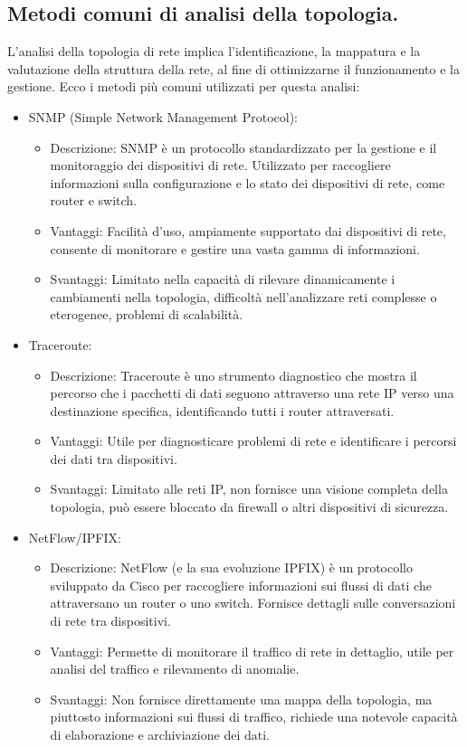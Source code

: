 \documentclass[target=bach,aauheader=,style=]{thud}
\begin{document}
\subsection{Metodi comuni di analisi della topologia.}
L'analisi della topologia di rete implica l'identificazione, la mappatura e la valutazione della struttura della rete, al fine di ottimizzarne il funzionamento e la gestione. Ecco i metodi più comuni utilizzati per questa analisi:
\begin{itemize}
  \item SNMP (Simple Network Management Protocol):
    \begin{itemize}
      \item Descrizione: SNMP è un protocollo standardizzato per la gestione e il monitoraggio dei dispositivi di rete. Utilizzato per raccogliere informazioni sulla configurazione e lo stato dei dispositivi di rete, come router e switch.
      \item Vantaggi: Facilità d'uso, ampiamente supportato dai dispositivi di rete, consente di monitorare e gestire una vasta gamma di informazioni.
      \item Svantaggi: Limitato nella capacità di rilevare dinamicamente i cambiamenti nella topologia, difficoltà nell'analizzare reti complesse o eterogenee, problemi di scalabilità.
    \end{itemize}

  \item Traceroute:
    \begin{itemize}
      \item Descrizione: Traceroute è uno strumento diagnostico che mostra il percorso che i pacchetti di dati seguono attraverso una rete IP verso una destinazione specifica, identificando tutti i router attraversati.
      \item Vantaggi: Utile per diagnosticare problemi di rete e identificare i percorsi dei dati tra dispositivi.
      \item Svantaggi: Limitato alle reti IP, non fornisce una visione completa della topologia, può essere bloccato da firewall o altri dispositivi di sicurezza.
    \end{itemize}

    \item NetFlow/IPFIX:
    \begin{itemize}
      \item Descrizione: NetFlow (e la sua evoluzione IPFIX) è un protocollo sviluppato da Cisco per raccogliere informazioni sui flussi di dati che attraversano un router o uno switch. Fornisce dettagli sulle conversazioni di rete tra dispositivi.
      \item Vantaggi: Permette di monitorare il traffico di rete in dettaglio, utile per analisi del traffico e rilevamento di anomalie.
      \item Svantaggi: Non fornisce direttamente una mappa della topologia, ma piuttosto informazioni sui flussi di traffico, richiede una notevole capacità di elaborazione e archiviazione dei dati.
    \end{itemize}


\end{itemize}
\end{document}
